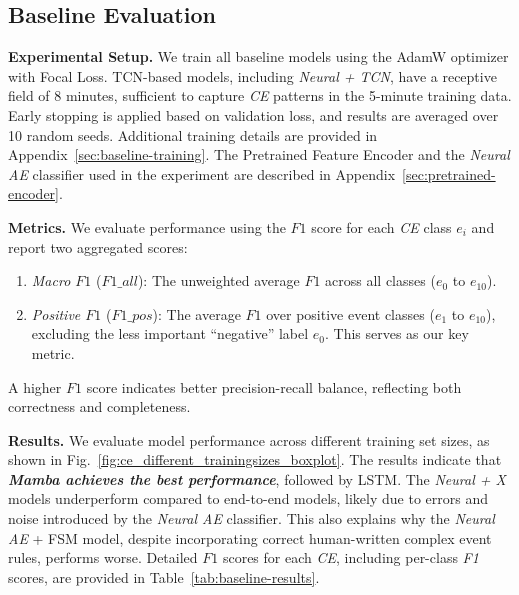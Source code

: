 \subsection{Baseline Evaluation}  

\textbf{Experimental Setup.}  
We train all baseline models using the AdamW optimizer with Focal Loss. TCN-based models, including \emph{Neural + TCN}, have a receptive field of 8 minutes, sufficient to capture \emph{CE} patterns in the 5-minute training data. Early stopping is applied based on validation loss, and results are averaged over 10 random seeds. Additional training details are provided in Appendix~\ref{sec:baseline-training}. The Pretrained Feature Encoder and the \emph{Neural AE} classifier used in the experiment are described in Appendix~\ref{sec:pretrained-encoder}.


\textbf{Metrics.}  
We evaluate performance using the $F1$ score for each \emph{CE} class $e_i$ and report two aggregated scores:  
\begin{enumerate}[leftmargin=1.5em,nosep]
    \item \emph{Macro $F1$} ($F1\_all$): The unweighted average $F1$ across all classes ($e_0$ to $e_{10}$).
    \item \emph{Positive $F1$} ($F1\_pos$): The average $F1$ over positive event classes ($e_1$ to $e_{10}$), excluding the less important ``negative'' label $e_0$. This serves as our key metric.
\end{enumerate}  
A higher $F1$ score indicates better precision-recall balance, reflecting both correctness and completeness.  



\textbf{Results.}  
We evaluate model performance across different training set sizes, as shown in Fig.~\ref{fig:ce_different_trainingsizes_boxplot}. The results indicate that \emph{\textbf{Mamba achieves the best performance}}, followed by LSTM. The \emph{Neural + X} models underperform compared to end-to-end models, likely due to errors and noise introduced by the \emph{Neural AE} classifier. This also explains why the \emph{Neural AE} + FSM model, despite incorporating correct human-written complex event rules, performs worse. Detailed $F1$ scores for each \emph{CE}, including per-class \emph{F1} scores, are provided in Table~\ref{tab:baseline-results}.


